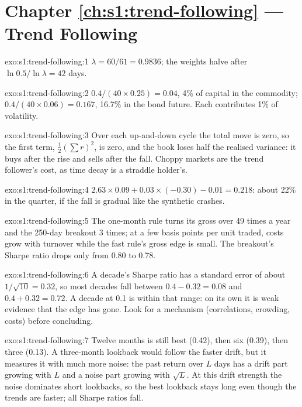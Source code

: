 \section*{Chapter \ref{ch:s1:trend-following} --- Trend Following}

\begin{solution}{exo:s1:trend-following:1}
$\lambda = 60/61 = 0.9836$; the weights halve after $\ln 0.5/\ln \lambda = 42$ days.
\end{solution}

\begin{solution}{exo:s1:trend-following:2}
$0.4/(40 \times 0.25) = 0.04$, 4\% of capital in the commodity; $0.4/(40 \times 0.06) = 0.167$, 16.7\% in the bond future. Each contributes 1\% of
volatility.
\end{solution}

\begin{solution}{exo:s1:trend-following:3}
Over each up-and-down cycle the total move is zero, so the first term, $\tfrac12(\sum r)^2$, is zero, and the book loses half the realised variance: it
buys after the rise and sells after the fall. Choppy markets are the trend follower's cost, as time decay is a straddle holder's.
\end{solution}

\begin{solution}{exo:s1:trend-following:4}
$2.63 \times 0.09 + 0.03 \times (-0.30) - 0.01 = 0.218$: about 22\% in the quarter, if the fall is gradual like the synthetic crashes.
\end{solution}

\begin{solution}{exo:s1:trend-following:5}
The one-month rule turns its gross over 49 times a year and the 250-day breakout 3 times; at a few basis points per unit traded, costs grow with
turnover while the fast rule's gross edge is small. The breakout's Sharpe ratio drops only from 0.80 to 0.78.
\end{solution}

\begin{solution}{exo:s1:trend-following:6}
A decade's Sharpe ratio has a standard error of about $1/\sqrt{10} = 0.32$, so most decades fall between $0.4 - 0.32 = 0.08$ and $0.4 + 0.32 = 0.72$. A
decade at 0.1 is within that range: on its own it is weak evidence that the edge has gone. Look for a mechanism (correlations, crowding, costs) before
concluding.
\end{solution}

\begin{solution}{exo:s1:trend-following:7}
Twelve months is still best (0.42), then six (0.39), then three (0.13). A three-month lookback would follow the faster drift, but it measures it with
much more noise: the past return over $L$ days has a drift part growing with $L$ and a noise part growing with $\sqrt{L}$. At this drift strength the
noise dominates short lookbacks, so the best lookback stays long even though the trends are faster; all Sharpe ratios fall.
\end{solution}


